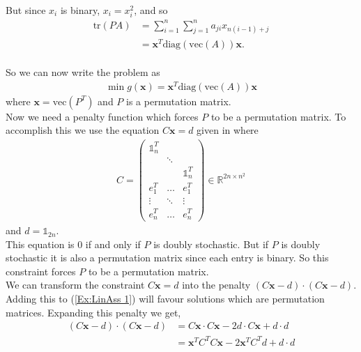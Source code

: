 \documentclass{article}
\begin{document}
But since \(x_i\) is binary, \(x_i = x_i^2\), and so 
\begin{align*}
    \text{tr}(PA) &= \sum_{i=1}^{n} \sum_{j=1}^{n} a_{ji}x_{n(i-1)+j} \\
    &= \mathbf{x}^T \text{diag}(\text{vec}(A))\mathbf{x}.
\end{align*}\\
\noindent So we can now write the problem as 
\begin{align} \label{Ex:LinAss 1}
    \min g(\mathbf{x}) = \mathbf{x}^T \text{diag}(\text{vec}(A)) \mathbf{x}
\end{align}
where \(\mathbf{x} = \text{vec}(P^T)\) and \(P\) is a permutation matrix.\\

\noindent Now we need a penalty function which forces \(P\) to be a permutation matrix. To accomplish this we use the equation \(C\mathbf{x} = d\) given in \cite[p.~8]{klus2023continuous} where 
\begin{align}\label{mat:CD}
    C = \begin{pmatrix}
        \mathbb{1}_n^T & & \\
         & \ddots & \\ 
         & & \mathbb{1}_n^T \\
         e_1^T & \hdots & e_1^T \\
         \vdots & \ddots & \vdots \\
         e_n^T & \hdots & e_n^T
    \end{pmatrix} \in \mathbb{R}^{2n \times n^2}
\end{align}
and \(d = \mathbb{1}_{2n}\). \\

\noindent This equation is 0 if and only if \(P\) is doubly stochastic. But if \(P\) is doubly stochastic it is also a permutation matrix since each entry is binary. So this constraint forces \(P\) to be a permutation matrix.\\

\noindent We can transform the constraint \(C\mathbf{x} = d\) into the penalty \((C\mathbf{x} - d) \cdot (C\mathbf{x} - d)\). Adding this to (\ref{Ex:LinAss 1}) will favour solutions which are  permutation matrices.
Expanding this penalty we get,
\begin{align*}
    (C\mathbf{x} - d) \cdot (C\mathbf{x} - d) &= C\mathbf{x} \cdot C\mathbf{x} - 2d\cdot C\mathbf{x} + d \cdot d \\
    &= \mathbf{x}^T C^T C \mathbf{x} -2\mathbf{x}^T C^T d + d\cdot d
\end{align*}
\end{document}
